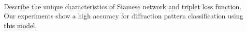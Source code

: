 




\

Describe the unique characteristics of Siamese network and triplet loss
function.  Our experiments show a high accuracy for diffraction pattern
classification using this model.
